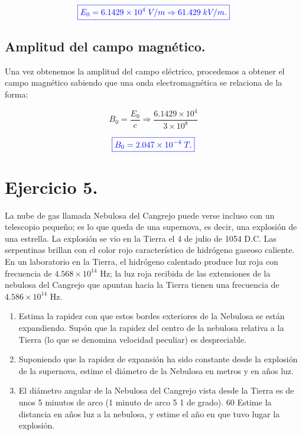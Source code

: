 \documentclass[a4paper,12pt]{article} %
\begin{document}
\[ \textcolor{blue}{\boxed{ E_0 = 6.1429 \times 10^4 \; V/m \Rightarrow 61.429 \; kV/m.}} \]

\vspace{\baselineskip}

\subsection{Amplitud del campo magnético.}

\begin{justify}
    Una vez obtenemos la amplitud del campo eléctrico, procedemos a obtener el campo magnético sabiendo que 
    una onda electromagnética se relaciona de la forma:
\end{justify}

\[ B_0 = \frac{E_0}{c} \Rightarrow \frac{6.1429 \times 10^4}{3 \times 10^8} \]

\vspace{\baselineskip}

\[ \textcolor{blue}{\boxed{B_0 = 2.047 \times 10^{-4} \; T.}} \]

\vspace{\baselineskip}

\section{Ejercicio 5.}

\vspace{\baselineskip}

\begin{justify}
    La nube de gas llamada Nebulosa del Cangrejo puede verse incluso con un telescopio pequeño; 
    es lo que queda de una supernova, es decir, una explosión de una estrella. 
    La explosión se vio en la Tierra el 4 de julio de 1054 D.C. Las serpentinas brillan con el color rojo
    característico de hidrógeno gaseoso caliente. En un laboratorio en la Tierra, el hidrógeno calentado
    produce luz roja con frecuencia de \( 4.568 \times 10^{14} \) Hz; la luz roja recibida de las extensiones de la
    nebulosa del Cangrejo que apuntan hacia la Tierra tienen una frecuencia de \( 4.586 \times 10^{14} \) Hz. 
\end{justify}

\begin{enumerate}
    \item Estima la rapidez con que estos bordes exteriores de la Nebulosa se están expandiendo. Supón que
    la rapidez del centro de la nebulosa relativa a la Tierra (lo que se denomina velocidad peculiar) es despreciable.

    \item Suponiendo que la rapidez de expansión ha sido constante desde la explosión de
    la supernova, estime el diámetro de la Nebulosa en metros y en años luz.

    \item El diámetro angular
    de la Nebulosa del Cangrejo vista desde la Tierra es de unos 5 minutos de arco (1 minuto de arco
    5 1 de grado). 60 Estime la distancia en años luz a la nebulosa, y estime el año en que tuvo lugar
    la explosión.
\end{enumerate}
\end{document}
